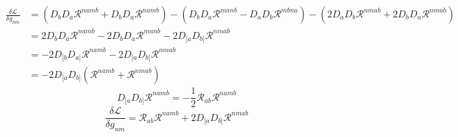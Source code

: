 \documentclass[aps,prd,preprint]{revtex4-1}
\begin{document}
\begin{fleqn}
\begin{equation*}
\begin{aligned}
    \frac{\delta \mathcal{L}}{\delta g_{nm}} &=
    \left( D_b D_a \mathcal{R}^{namb} + D_b D_a \mathcal{R}^{namb} \right)
    - \left( D_b D_a \mathcal{R}^{manb}  - D_a D_b \mathcal{R}^{mbna}\right)
    - \left( 2 D_a D_b \mathcal{R}^{nmab} + 2 D_b D_a \mathcal{R}^{nmab} \right) \\
    &= 2 D_b D_a \mathcal{R}^{namb} - 2 D_b D_a \mathcal{R}^{manb} - 2 D_{[a} D_{b]} \mathcal{R}^{nmab} \\
    &= -2 D_{[b} D_{a]} \mathcal{R}^{namb} - 2 D_{[a} D_{b]} \mathcal{R}^{nmab} \\
    &= - 2 D_{[a} D_{b]} \left( \mathcal{R}^{namb} + \mathcal{R}^{nmab} \right)
\end{aligned}
\end{equation*}
\begin{equation*}
    D_{[a} D_{b]} \mathcal{R}^{namb} = -\frac{1}{2} \mathcal{R}_{ab}\mathcal{R}^{namb}
\end{equation*}
\begin{equation*}
\boxed{
    \frac{\delta \mathcal{L}}{\delta g_{nm}} = \mathcal{R}_{ab} \mathcal{R}^{namb} + 2 D_{[a} D_{b]} \mathcal{R}^{nmab}
}
\end{equation*}
\end{fleqn}


\end{document}
